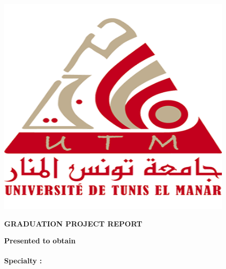 \hfill
\begin{minipage}[l]{0.02\columnwidth}
\end{minipage}
\hfill
\begin{minipage}[l]{0.18\columnwidth}
\vspace{6mm}
\includegraphics[width=0.9\columnwidth]{Logo_UTM}\\
\end{minipage}
\vskip1.5cm

\begin{center}
{\LARGE{\textbf{\textsc{GRADUATION PROJECT REPORT}}}}\\
\vskip0.5cm
\large

{\textbf{Presented to obtain}}\\
\vskip2mm
{\textbf{\@diplomaName}}\\
{\textbf{Specialty : \@speciality}}\\
{}
\end{center}

